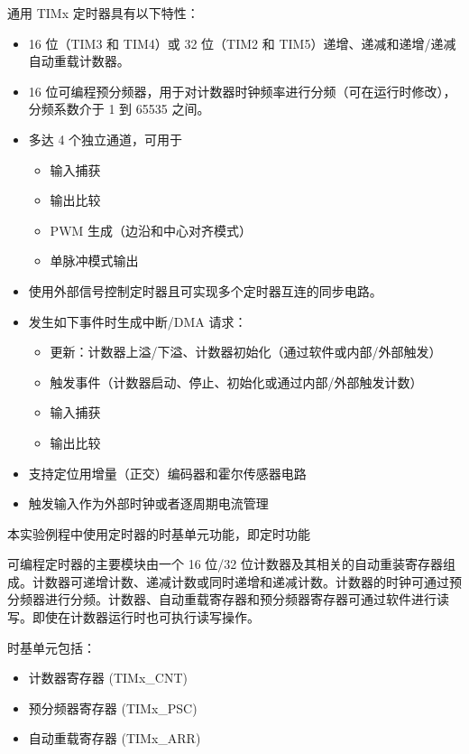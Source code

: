 ﻿\documentclass[UTF8,12pt]{article}
\begin{document}
\begin{enumerate}
    通用 TIMx 定时器具有以下特性：
    \begin{itemize}
      \item 16 位（TIM3 和 TIM4）或 32 位（TIM2 和 TIM5）递增、递减和递增/递减自动重载计数器。
      \item 16 位可编程预分频器，用于对计数器时钟频率进行分频（可在运行时修改），分频系数介于 1 到 65535 之间。
      \item 多达 4 个独立通道，可用于
      \begin{itemize}
        \item 输入捕获
        \item 输出比较
        \item PWM 生成（边沿和中心对齐模式）
        \item 单脉冲模式输出
      \end{itemize}
      \item 使用外部信号控制定时器且可实现多个定时器互连的同步电路。
      \item 发生如下事件时生成中断/DMA 请求：
      \begin{itemize}
        \item 更新：计数器上溢/下溢、计数器初始化（通过软件或内部/外部触发）
        \item 触发事件（计数器启动、停止、初始化或通过内部/外部触发计数）
        \item 输入捕获
        \item 输出比较
      \end{itemize}
      \item 支持定位用增量（正交）编码器和霍尔传感器电路
      \item 触发输入作为外部时钟或者逐周期电流管理
    \end{itemize}

    本实验例程中使用定时器的时基单元功能，即定时功能

    可编程定时器的主要模块由一个 16 位/32 位计数器及其相关的自动重装寄存器组成。计数器可递增计数、递减计数或同时递增和递减计数。计数器的时钟可通过预分频器进行分频。计数器、自动重载寄存器和预分频器寄存器可通过软件进行读写。即使在计数器运行时也可执行读写操作。

    时基单元包括：

    \begin{itemize}
      \item 计数器寄存器 (TIMx\_CNT)
      \item 预分频器寄存器 (TIMx\_PSC)
      \item 自动重载寄存器 (TIMx\_ARR)
    \end{itemize}


\end{enumerate}
\end{document}
